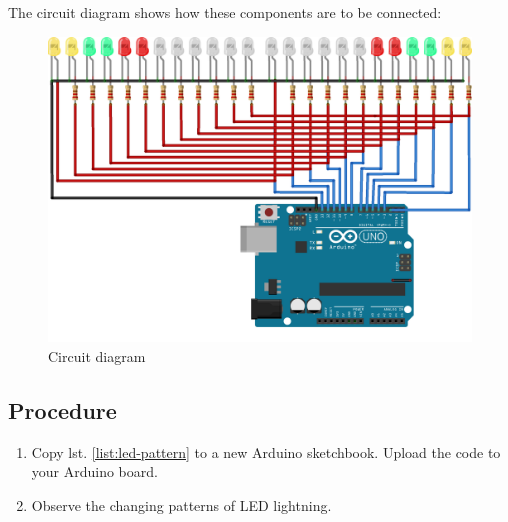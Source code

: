 The circuit diagram shows how these components are to be connected:

	\begin{figure}[H]
	\centering \includegraphics[width=0.6\linewidth]{Figures/recreational_exp/led pattern_bb.png}
	\caption{Circuit diagram}
	\end{figure}
	
\subsection*{Procedure}
\begin{enumerate}[leftmargin=*]
     \item Copy lst. \ref{list:led-pattern} to a new Arduino sketchbook. Upload the code to your Arduino board.
    \item Observe the changing patterns of LED lightning. 
    
\end{enumerate}
	
